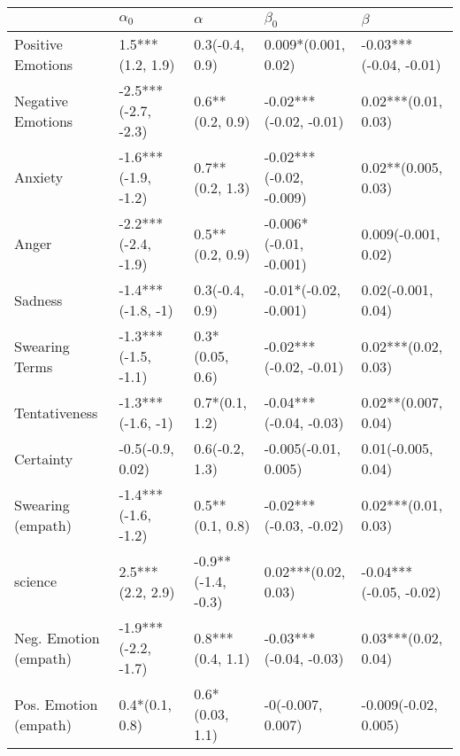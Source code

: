 \begin{tabular}{lllll}
\toprule
{} &           $\alpha_0$ &            $\alpha$ &                $\beta_0$ &                 $\beta$ \\
\midrule
Positive Emotions     &     1.5***(1.2, 1.9) &      0.3(-0.4, 0.9) &      0.009*(0.001, 0.02) &  -0.03***(-0.04, -0.01) \\
Negative Emotions     &  -2.5***(-2.7, -2.3) &     0.6**(0.2, 0.9) &   -0.02***(-0.02, -0.01) &     0.02***(0.01, 0.03) \\
Anxiety               &  -1.6***(-1.9, -1.2) &     0.7**(0.2, 1.3) &  -0.02***(-0.02, -0.009) &     0.02**(0.005, 0.03) \\
Anger                 &  -2.2***(-2.4, -1.9) &     0.5**(0.2, 0.9) &   -0.006*(-0.01, -0.001) &     0.009(-0.001, 0.02) \\
Sadness               &    -1.4***(-1.8, -1) &      0.3(-0.4, 0.9) &    -0.01*(-0.02, -0.001) &      0.02(-0.001, 0.04) \\
Swearing Terms        &  -1.3***(-1.5, -1.1) &     0.3*(0.05, 0.6) &   -0.02***(-0.02, -0.01) &     0.02***(0.02, 0.03) \\
Tentativeness         &    -1.3***(-1.6, -1) &      0.7*(0.1, 1.2) &   -0.04***(-0.04, -0.03) &     0.02**(0.007, 0.04) \\
Certainty             &     -0.5(-0.9, 0.02) &      0.6(-0.2, 1.3) &     -0.005(-0.01, 0.005) &      0.01(-0.005, 0.04) \\
Swearing (empath)     &  -1.4***(-1.6, -1.2) &     0.5**(0.1, 0.8) &   -0.02***(-0.03, -0.02) &     0.02***(0.01, 0.03) \\
science               &     2.5***(2.2, 2.9) &  -0.9**(-1.4, -0.3) &      0.02***(0.02, 0.03) &  -0.04***(-0.05, -0.02) \\
Neg. Emotion (empath) &  -1.9***(-2.2, -1.7) &    0.8***(0.4, 1.1) &   -0.03***(-0.04, -0.03) &     0.03***(0.02, 0.04) \\
Pos. Emotion (empath) &       0.4*(0.1, 0.8) &     0.6*(0.03, 1.1) &        -0(-0.007, 0.007) &    -0.009(-0.02, 0.005) \\
\bottomrule
\end{tabular}
